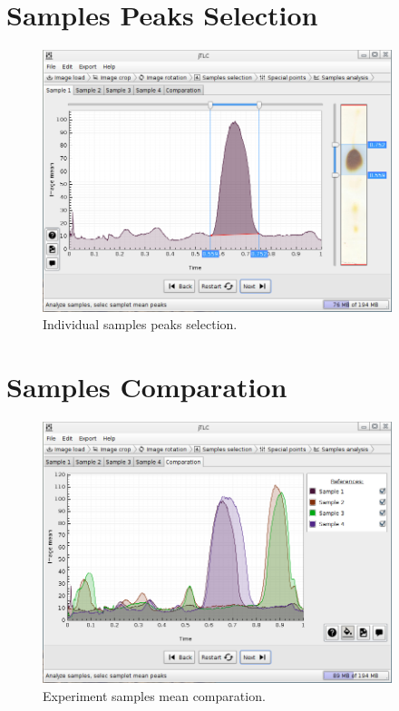 \section{Samples Peaks Selection}
\begin{figure}[H]
	\vspace{0cm}
	\centering
	\includegraphics[width=385px]{imagenes/analysis}
	\centering
	\vspace{-0.4cm}
	\caption{Individual samples peaks selection.}
	\label{fig:image_samples_peaks}
	\vspace{-0.25cm}
\end{figure}

\section{Samples Comparation}
\begin{figure}[H]
	\vspace{0cm}
	\centering
	\includegraphics[width=385px]{imagenes/comparation}
	\centering
	\vspace{-0.4cm}
	\caption{Experiment samples mean comparation.}
	\label{fig:image_samples_comparation}
	\vspace{-0.25cm}
\end{figure}

